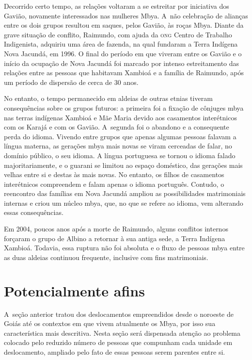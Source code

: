 Decorrido certo tempo, as relações voltaram a se estreitar por
iniciativa dos Gavião, novamente interessados nas mulheres Mbya. A~não
celebração de alianças entre os dois grupos resultou em saques, pelos
Gavião, às roças Mbya. Diante da grave situação de conflito, Raimundo,
com ajuda da \textsc{ong} Centro de Trabalho Indigenista, adquiriu uma área de
fazenda, na qual fundaram a Terra Indígena Nova Jacundá, em 1996. O
final do período em que viveram entre os Gavião e o início da ocupação
de Nova Jacundá foi marcado por intenso estreitamento das relações
entre as pessoas que habitavam Xambioá e a família de Raimundo, após um
período de dispersão de cerca de 30 anos.

No entanto, o tempo permanecido em aldeias de outras etnias tiveram
consequências sobre os grupos futuros: a primeira foi a fixação de
cônjuges mbya nas terras indígenas Xambioá e Mãe Maria devido aos
casamentos interétnicos com os Karajá e com os Gavião. A~segunda foi o
abandono e a consequente perda do idioma. Vivendo entre grupos que
apenas algumas pessoas falavam a língua materna, as gerações mbya mais
novas se viram cerceadas de falar, no domínio público, o seu idioma. A
língua portuguesa se tornou o idioma falado majoritariamente, e o
guarani se limitou ao espaço doméstico, das gerações mais velhas entre
si e destas às mais novas. No entanto, os filhos de casamentos
interétnicos compreendem e falam apenas o idioma português. Contudo, o
reencontro das famílias em Nova Jacundá ampliou as possibilidades
matrimoniais internas e criou um núcleo mbya, que, no que se refere ao
idioma, vem alterando essas consequências.

Em 2004, poucos anos após a morte de Raimundo, alguns conflitos internos
forçaram o grupo de Albino a retornar à sua antiga sede, a Terra
Indígena Xambioá. Todavia, essa ruptura não foi absoluta e o fluxo de
pessoas mbya entre as duas aldeias continuou frequente, inclusive com
fins matrimoniais.

\section{Potencialmente afins}

A~seção anterior tratou dos deslocamentos empreendidos desde o noroeste
de Goiás até os contextos em que vivem atualmente os Mbya, por isso sua
característica mais descritiva. Nesta seção será dispensada atenção ao
problema colocado pelo reduzido número de pessoas que compunham cada
unidade em deslocamento, ampliado pelo fato de essas pessoas serem
parentes entre si.

